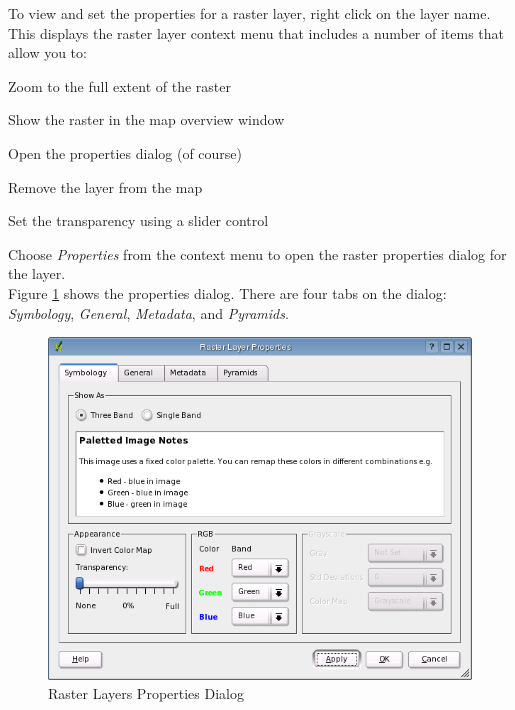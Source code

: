 \documentclass[10pt,english]{article}
\begin{document}
\begin{onehalfspace}
To
view and set the properties for a raster layer, right click on the layer name.
This displays the raster layer context menu that includes a number of items that
allow you to:
\begin{compactitem}
\item Zoom to the full extent of the raster
\item Show the raster in the map overview window
\item Open the properties dialog (of course)
\item Remove the layer from the map
\item Set the transparency using a slider control
\end{compactitem}
Choose \textsl{Properties} from the context menu to open the raster properties
dialog for the layer.\\


Figure \ref{fig:raster_properties} shows the properties dialog. There are four tabs on the dialog: \textsl{Symbology}, \textsl{General}, \textsl{Metadata}, and \textsl{Pyramids}.

\begin{figure}[h]
   \begin{center}
   \caption{Raster Layers Properties Dialog}\label{fig:raster_properties}\smallskip
   \includegraphics[scale=.7]{qgis_user_guide_images/raster_properties}
\end{center}  
\end{figure}



\end{onehalfspace}
\end{document}
